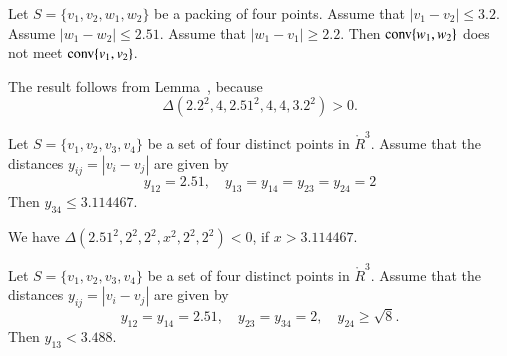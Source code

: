 \begin{tarskidata}
\begin{tarski}
\begin{lemma}
Let $S=\{v_1,v_2,w_1,w_2\}$ be a packing of four points. 
Assume that $|v_1-v_2|\le 3.2$.  Assume $|w_1-w_2|\le 2.51$. 
Assume that
	$|w_1-v_1|\ge 2.2$.
Then
${\operatorname{conv}}\{w_1,w_2\}$ does not meet ${\operatorname{conv}}\{v_1,v_2\}$.
\end{lemma}


\begin{proved}
The result follows from Lemma~,
because
    $$
    \Delta(2.2^2,4,2.51^2,4,4,3.2^2) > 0.
    $$
\swallowed\end{proved}
\end{tarski}





\begin{tarski}

\begin{lemma}
Let $S=\{v_1,v_2,v_3,v_4\}$ be a set of four distinct points in $\ring{R}^3$.  Assume that
the distances $y_{ij}=|v_i-v_j|$ are given by
	$$
	y_{12}=2.51, \quad y_{13} = y_{14}=
	y_{23}=y_{24}=2
	$$
Then $y_{34}\le 3.114467$.
\end{lemma}


\begin{proved}
We have
    $\Delta(2.51^2,2^2,2^2,x^2,2^2,2^2)<0$, if $x> 3.114467$.
\swallowed\end{proved}
\end{tarski}





\begin{tarski}

\begin{lemma}
Let $S=\{v_1,v_2,v_3,v_4\}$ be a set of four distinct points in $\ring{R}^3$.  Assume that
the distances $y_{ij}=|v_i-v_j|$ are given by
	$$
        y_{12}=y_{14}=2.51,\quad y_{23}=y_{34}=2,\quad y_{24}\ge\sqrt8.
	$$
Then $y_{13}< 3.488$.
\end{lemma}


\end{tarski}
\end{tarskidata}
